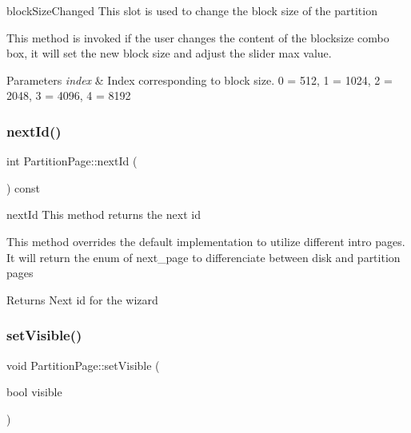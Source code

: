 block\+Size\+Changed This slot is used to change the block size of the partition 

This method is invoked if the user changes the content of the blocksize combo box, it will set the new block size and adjust the slider max value. 
\begin{DoxyParams}{Parameters}
{\em index} & Index corresponding to block size. 0 = 512, 1 = 1024, 2 = 2048, 3 = 4096, 4 = 8192 \\
\hline
\end{DoxyParams}
\mbox{\label{class_partition_page_a63ae270155bc6d01ae83adf63860d6f9}} 
\subsubsection{\texorpdfstring{next\+Id()}{nextId()}}
{\footnotesize\ttfamily int Partition\+Page\+::next\+Id (\begin{DoxyParamCaption}{ }\end{DoxyParamCaption}) const\hspace{0.3cm}{\ttfamily [override]}}



next\+Id This method returns the next id 

This method overrides the default implementation to utilize different intro pages. It will return the enum of next\+\_\+page to differenciate between disk and partition pages \begin{DoxyReturn}{Returns}
Next id for the wizard 
\end{DoxyReturn}
\mbox{\label{class_partition_page_a105573c5cd7af63d8425672c45d2540f}} 
\subsubsection{\texorpdfstring{set\+Visible()}{setVisible()}}
{\footnotesize\ttfamily void Partition\+Page\+::set\+Visible (\begin{DoxyParamCaption}\item[{bool}]{visible }\end{DoxyParamCaption})\hspace{0.3cm}{\ttfamily [override]}}



